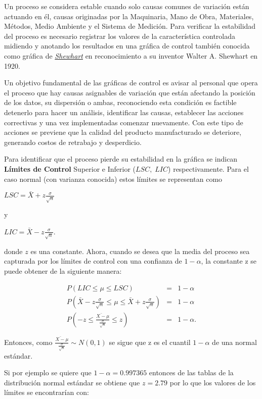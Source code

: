 \documentclass[spanish]{report}
\begin{document}
Un proceso se considera estable cuando solo causas comunes de variación
están actuando en él, causas originadas por la Maquinaria, Mano de
Obra, Materiales, Métodos, Medio Ambiente y el Sistema de Medición.
Para verificar la estabilidad del proceso es necesario registrar los
valores de la característica controlada midiendo y anotando los resultados
en una gráfica de control también conocida como gráfica de \emph{\uline{Shewhart}}
en reconocimiento a su inventor Walter A. Shewhart en 1920.

Un objetivo fundamental de las gráficas de control es avisar al personal
que opera el proceso que hay causas asignables de variación que están
afectando la posición de los datos, su dispersión o ambas, reconociendo
esta condición es factible detenerlo para hacer un análisis, identificar
las causas, establecer las acciones correctivas y una vez implementadas
comenzar nuevamente. Con este tipo de acciones se previene que la
calidad del producto manufacturado se deteriore, generando costos
de retrabajo y desperdicio.

Para identificar que el proceso pierde su estabilidad en la gráfica
se indican \textbf{Límites de Control} Superior e Inferior
($LSC,\;LIC$) respectivamente. Para el caso normal (con varianza conocida) estos
límites se representan como

$LSC=\bar{X}+z\frac{\sigma}{\sqrt{n}}$

y

$LIC=\bar{X}-z\frac{\sigma}{\sqrt{n}}$.

donde $z$ es una constante. Ahora, cuando se desea que la media del
proceso sea capturada por los límites de control con una confianza
de $1-\alpha$, la constante z se puede obtener de la siguiente
manera:


\begin{eqnarray*}
P(LIC\leq\mu\leq LSC) & = & 1-\alpha\\
P(\bar{X}-z\frac{\sigma}{\sqrt{n}}\leq\mu\leq\bar{X}+z\frac{\sigma}{\sqrt{n}}) & = & 1-\alpha\\
P(-z\leq\frac{\bar{X-}\mu}{\frac{\sigma}{\sqrt{n}}}\leq z) & = & 1-\alpha.
\end{eqnarray*}


Entonces, como $\frac{\bar{X-}\mu}{\frac{\sigma}{\sqrt{n}}}\sim N(0,1)$
se sigue que z es el cuantil $1-\alpha$ de una normal estándar.

Si por ejemplo se quiere que $1-\alpha=0.997365$ entonces de las tablas de la distribución normal estándar se obtiene que $z=2.79$
por lo que los valores de los límites se encontrarían con: 
\end{document}
